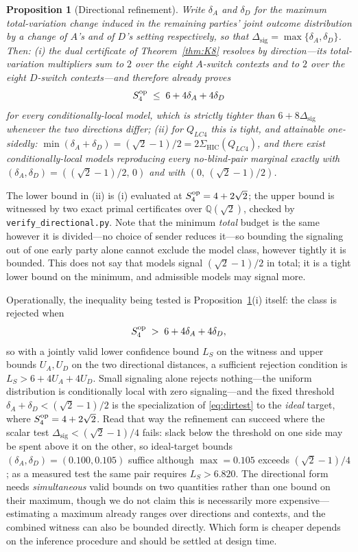 \documentclass[10pt,twocolumn]{article}
\newtheorem{proposition}{Proposition}
\newcommand{\Sig}{\Sigma_{\mathrm{HIC}}}
\newcommand{\Dsig}{\Delta_{\mathrm{sig}}}
\begin{document}
\begin{proposition}[Directional refinement]
\label{prop:directional}
Write $\delta_A$ and $\delta_D$ for the maximum total-variation change induced in the remaining parties' joint outcome distribution by a change of $A$'s and of $D$'s setting respectively, so that $\Dsig = \max\{\delta_A,\delta_D\}$. Then:
\emph{(i)} the dual certificate of Theorem~\ref{thm:K8} resolves by direction---its total-variation multipliers sum to $2$ over the eight $A$-switch contexts and to $2$ over the eight $D$-switch contexts---and therefore already proves
\[
S_4^{\rm op} \;\le\; 6 + 4\delta_A + 4\delta_D
\]
for every conditionally-local model, which is strictly tighter than $6+8\Dsig$ whenever the two directions differ;
\emph{(ii)} for $Q_{LC4}$ this is tight, and attainable one-sidedly: $\min(\delta_A+\delta_D) = (\sqrt2-1)/2 = 2\Sig(Q_{LC4})$, and there exist conditionally-local models reproducing every no-blind-pair marginal exactly with $(\delta_A,\delta_D) = ((\sqrt2-1)/2,\,0)$ and with $(0,\,(\sqrt2-1)/2)$.
\end{proposition}

The lower bound in (ii) is (i) evaluated at $S_4^{\rm op}=4+2\sqrt2$; the upper bound is witnessed by two exact primal certificates over $\mathbb{Q}(\sqrt2)$, checked by \texttt{verify\_directional.py}. Note that the minimum \emph{total} budget is the same however it is divided---no choice of sender reduces it---so bounding the signaling out of one early party alone cannot exclude the model class, however tightly it is bounded. This does not say that models signal $(\sqrt2-1)/2$ in total; it is a tight lower bound on the minimum, and admissible models may signal more.

Operationally, the inequality being tested is Proposition~\ref{prop:directional}(i) itself: the class is rejected when
\begin{equation}
S_4^{\rm op} \;>\; 6 + 4\delta_A + 4\delta_D ,
\label{eq:dirtest}
\end{equation}
so with a jointly valid lower confidence bound $L_S$ on the witness and upper bounds $U_A,U_D$ on the two directional distances, a sufficient rejection condition is $L_S > 6 + 4U_A + 4U_D$. Small signaling alone rejects nothing---the uniform distribution is conditionally local with zero signaling---and the fixed threshold $\delta_A+\delta_D<(\sqrt2-1)/2$ is the specialization of \eqref{eq:dirtest} to the \emph{ideal} target, where $S_4^{\rm op}=4+2\sqrt2$. Read that way the refinement can succeed where the scalar test $\Dsig<(\sqrt2-1)/4$ fails: slack below the threshold on one side may be spent above it on the other, so ideal-target bounds $(\delta_A,\delta_D)=(0.100,0.105)$ suffice although $\max=0.105$ exceeds $(\sqrt2-1)/4$; as a measured test the same pair requires $L_S>6.820$. The directional form needs \emph{simultaneous} valid bounds on two quantities rather than one bound on their maximum, though we do not claim this is necessarily more expensive---estimating a maximum already ranges over directions and contexts, and the combined witness can also be bounded directly. Which form is cheaper depends on the inference procedure and should be settled at design time.
\end{document}
